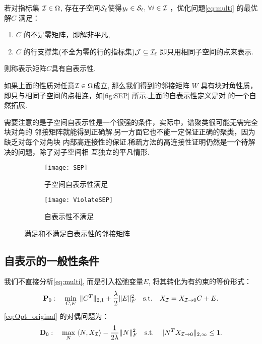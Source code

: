 \begin{definition}[子空间自表示性]\label{def:lasso_detection}
  若对指标集 \(\mathcal{I}\in \Omega\), 存在子空间\(\mathcal{S}_\ell\)使得\(y_i\in \mathcal{S}_\ell,\,
  \forall i \in \mathcal{I}\) ，优化问题\eqref{eq:multi} 的最优解\(C\) 满足：
  \begin{enumerate}
    \item \(C\) 的不是零矩阵，即解非平凡,
    \item \(C\) 的行支撑集(不全为零的行的指标集)\(\mathcal{J}\subseteq \mathcal{I}_\ell\)
      即只用相同子空间的点来表示.
  \end{enumerate}
  则称表示矩阵\(C\)具有自表示性.
\end{definition}

如果上面的性质对任意\(\mathcal{I} \in \Omega\)成立, 那么我们得到的邻接矩阵 \(W\)
具有块对角性质，即只与相同子空间的点相连，如\autoref{fig:SEP}
所示.上面的自表示性定义是对 \cite[定义~1.1]{elhamifar2013sparse}
的一个自然拓展.

需要注意的是子空间自表示性是一个很强的条件，实际中，谱聚类很可能无需完全块对角的
邻接矩阵就能得到正确解.另一方面它也不能一定保证正确的聚类，因为缺乏对每个对角块
内部高连接性的保证.稀疏方法的高连接性证明仍然是一个待解决的问题，除了对子空间相
互独立的平凡情形\cite{liu2013robust, wang2013provable}.
\begin{figure}[tb]
  \centering
  \begin{subfigure}[b]{0.4\textwidth}
    \texttt{[image: SEP]}
    \caption{子空间自表示性满足}
  \end{subfigure}
  \begin{subfigure}[b]{0.4\textwidth}
    \texttt{[image: ViolateSEP]}
    \caption{自表示性不满足}
  \end{subfigure}
  \caption{满足和不满足自表示性的邻接矩阵}
  \label{fig:SEP}
\end{figure}

\subsection{自表示的一般性条件}
我们不直接分析\eqref{eq:multi}, 而是引入松弛变量\(E\), 将其转化为有约束的等价形式：
\begin{equation}\label{eq:Opt_original}
  \mathbf{P}_0:\quad \min_{C, E} \;
  \|C^T\|_{2,1}+\frac{\lambda}{2}\|E\|_F^2 \quad
  \text{s.t.} \quad X_{\mathcal{I}}=X_{\mathcal{I}\rightarrow 0}C+E.
\end{equation}
\eqref{eq:Opt_original} 的对偶问题为：
\begin{equation}\label{eq:Opt_original_dual}
  \mathbf{D}_0:\quad \max_{N} \; \langle N, X_{\mathcal{I}}\rangle -
  \frac{1}{2\lambda}\|N\|_F^2 \quad
  \text{s.t.} \quad \|N^T X_{\mathcal{I}\rightarrow 0}\|_{2,\infty} \leq 1.
\end{equation}


